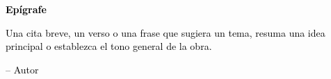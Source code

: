 \thispagestyle{empty}
\vspace*{2cm}

{
\Huge \textbf{\textcolor{black}{Epígrafe}} \\[1.0cm]

\epigraph{
\textcolor{black}{
Una cita breve, un verso o una frase que sugiera un tema, resuma una idea principal o establezca el tono general de la obra.
}
}{
\textcolor{black}{-- Autor}
}
}

\clearpage
